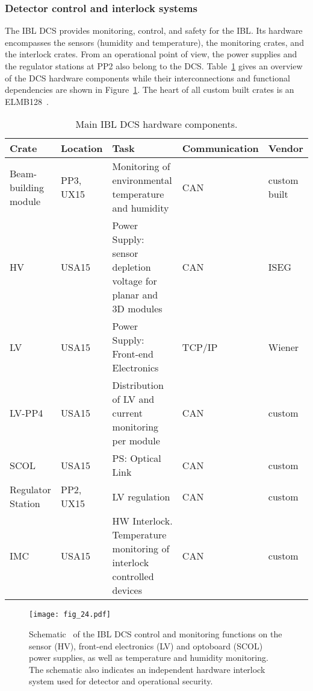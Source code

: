 \documentclass[cernpreprint, atlasdraft=false, UKenglish,british,orcidlogo, texmf, orcidlogo]{atlasdoc}
\begin{document}
\subsubsection{Detector control and interlock systems}
 
The \gls{IBL} \gls{DCS} provides monitoring, control, and safety for the \gls{IBL}. Its hardware encompasses the sensors (humidity and temperature), the monitoring crates, and the interlock crates. From an operational point of view, the power supplies and the regulator stations at \gls{PP2} also belong to the \gls{DCS}. Table~\ref{tab:IBL_DCS} gives an overview of the \gls{DCS} hardware components while their interconnections and functional dependencies are shown in Figure~\ref{fig:IBL_DCS}. The heart of all custom built crates is an \gls{ELMB}128~\cite{ELMB}.
 
\begin{table}
\caption{Main \gls{IBL} \gls{DCS} hardware components.
\label{tab:IBL_DCS}
}
\centering
\begin{adjustbox}{max width=1.0\textwidth}
\begin{tabular}{|l|l|l|l|l|}
\hline\hline
Crate & Location & Task & Communication & Vendor \\
\hline\hline
Beam-building module & PP3, UX15 & Monitoring of environmental temperature and humidity & CAN & custom built\\
\hline
\gls{HV} & USA15 &Power Supply: sensor depletion voltage for planar and 3D modules& CAN &ISEG\\
\hline
\gls{LV} & USA15 &Power Supply: Front-end Electronics & TCP/IP&Wiener\\
\hline
LV-PP4 & USA15 & Distribution of \gls{LV} and current monitoring per module & CAN &custom\\
\hline
\gls{SCOL} & USA15 & PS: Optical Link& CAN &custom\\
\hline
Regulator Station & PP2, UX15 & LV regulation & CAN &custom\\
\hline
IMC & USA15 & HW Interlock. Temperature monitoring of interlock controlled devices & CAN &custom\\
\hline
\end{tabular}
\end{adjustbox}
\end{table}
 
\begin{figure}
\centering
\texttt{[image: fig\_24.pdf]}
\caption{Schematic~\cite{PIX-2018-001} of the \gls{IBL} \gls{DCS} control and monitoring functions on the sensor (\gls{HV}), front-end electronics (\gls{LV}) and optoboard (\gls{SCOL}) power supplies, as well as temperature and humidity monitoring. The schematic also indicates an independent hardware interlock system used for detector and operational security. }
\label{fig:IBL_DCS}
\end{figure}
 
\end{document}
